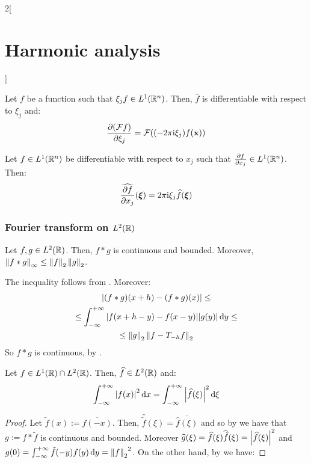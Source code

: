 \documentclass[../../../main_math.tex]{subfiles}
\begin{document}
\begin{multicols}{2}[\section{Harmonic analysis}]
\begin{theorem}
\begin{enumerate}
    \end{enumerate}
  \end{theorem}
  \begin{proposition}
    Let $f$ be a function such that $\xi_j f\in L^1(\mathbb{R}^n)$. Then, $\widehat{f}$ is differentiable with respect to $\xi_j$ and:
    $$\pdv{(\mathcal{F}f)}{\xi_j}(\boldsymbol{\mathrm{\xi}})=\mathcal{F}({(-2\pi\mathrm{i} \xi_j)}f(\boldsymbol{\mathrm{x}}))$$
  \end{proposition}
  \begin{proposition}
    Let $f\in L^1(\mathbb{R}^n)$ be differentiable with respect to $x_j$ such that $\pdv{f}{x_j}\in L^1(\mathbb{R}^n)$. Then: $$\widehat{\pdv{f}{x_j}}(\boldsymbol{\mathrm{\xi}})={2\pi\mathrm{i}\xi_j}\widehat{f}(\boldsymbol{\mathrm{\xi}})$$
  \end{proposition}
  \subsubsection{Fourier transform on \texorpdfstring{$L^2(\mathbb{R})$}{L2(R)}}
  \begin{lemma}\label{HA:lemaPrePlancherel}
    Let $f,g\in L^2(\mathbb{R})$. Then, $f*g$ is continuous and bounded. Moreover, $\left\|f*g\right\|_\infty\leq \left\|f\right\|_2\left\|g\right\|_2$.
  \end{lemma}
  \begin{sproof}
    The inequality follows from . Moreover:
    \begin{multline*}
      \abs{(f*g)(x+h)-(f*g)(x)} \leq\\
      \leq\int_{-\infty}^{+\infty}\abs{f(x+h-y)-f(x-y)}\abs{g(y)}\dd{y}\leq\\
      \leq\left\|g\right\|_2\left\|f-T_{-h}f\right\|_2
    \end{multline*}
    So $f*g$ is continuous, by .
  \end{sproof}
  \begin{theorem}\label{HA:plancherel}
    Let $f\in L^1(\mathbb{R})\cap L^2(\mathbb{R})$. Then, $\widehat{f}\in L^2(\mathbb{R})$ and:
    $$\int_{-\infty}^{+\infty}\abs{f(x)}^2\dd{x}=\int_{-\infty}^{+\infty}\abs{\widehat{f}(\xi)}^2\dd{\xi}$$
  \end{theorem}
  \begin{proof}
    Let $\tilde{f}(x):=\overline{f(-x)}$. Then, $\widehat{\tilde{f}}(\xi)=\overline{\widehat{f}(\xi)}$ and so by  we have that $g:=f*\tilde{f}$ is continuous and bounded. Moreover $\widehat{g}(\xi)=\widehat{f}(\xi)\widehat{\tilde{f}}(\xi)=\abs{\widehat{f}(\xi)}^2$ and $g(0)=\int_{-\infty}^{+\infty}\tilde{f}(-y)f(y)\dd{y}={\left\|f\right\|_2}^2$. On the other hand, by  we have:

\end{proof}
\end{multicols}
\end{document}
